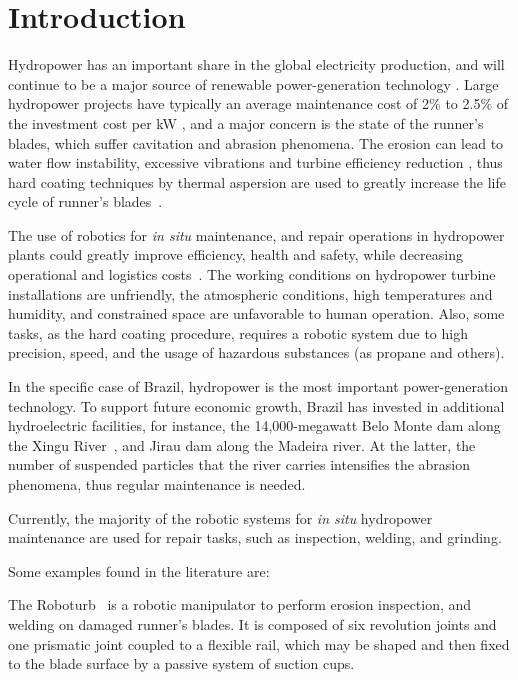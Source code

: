 \section{Introduction}

Hydropower has an important share in the global electricity production, and
will continue to be a major source of renewable power-generation technology
\cite{iea}. Large hydropower projects have typically an ave\-rage maintenance
cost of 2\% to 2.5\% of the investment cost per kW \cite{irena}, and a major
concern is the state of the runner's blades, which suffer cavitation and
abrasion phenomena. The erosion can lead to water flow instability, excessive
vibrations and turbine efficiency reduction \cite{goldemberg2007energia}, thus
hard coating techniques by thermal aspersion are used to greatly increase the
life cycle of runner's blades~\cite{krella2011new}.

The use of robotics for \textit{in situ} maintenance, and repair operations in
hydropower plants could greatly improve efficiency, health and safety, while
decreasing operational and logistics costs~\cite{hazel2012field}. The working
conditions on hydropower turbine installations are unfriendly, the atmospheric
conditions, high temperatures and humidity, and constrained space are
unfavorable to human operation. Also, some tasks, as the hard coating
procedure, requires a robotic system due to high precision, speed, and the
usage of hazardous substances (as propane and others).

In the specific case of Brazil, hydropower is the most important
power-generation technology. To support future economic growth, Brazil has
invested in additional hydroelectric facilities, for instance, the
14,000-megawatt Belo Monte dam along the Xingu River~\cite{eia}, and Jirau dam
along the Madeira river. At the latter, the number of suspended particles that
the river carries intensifies the abrasion phenomena, thus regular maintenance
is needed.

Currently, the majority of the robotic systems for \textit{in situ} hydropower
maintenance are used for repair tasks, such as inspection, welding, and
grinding. 

Some examples found in the literature are:

The Roboturb~\cite{roboturb} is a robotic manipulator to perform erosion
inspection, and welding on damaged runner's blades. It is composed of six
revolution joints and one prismatic joint coupled to a flexible rail, which may
be shaped and then fixed to the blade surface by a passive system of suction cups.

